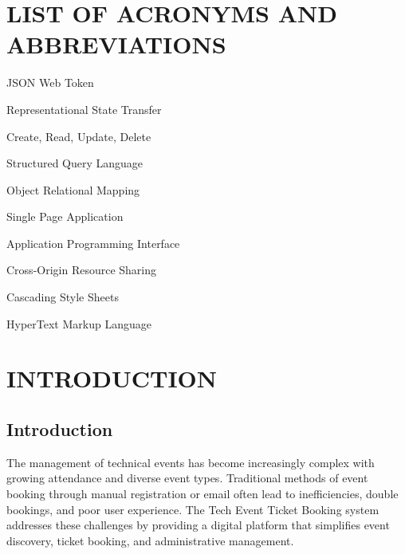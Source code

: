 \documentclass[12pt]{report}
\begin{document}
\listoftables 

 
\newpage 
{} 
  
\chapter*{LIST OF ACRONYMS AND ABBREVIATIONS} 
\begin{abbrv} 
  
\item[JWT] JSON Web Token
\item[REST] Representational State Transfer
\item[CRUD] Create, Read, Update, Delete
\item[SQL] Structured Query Language
\item[ORM] Object Relational Mapping
\item[SPA] Single Page Application
\item[API] Application Programming Interface
\item[CORS] Cross-Origin Resource Sharing
\item[CSS] Cascading Style Sheets
\item[HTML] HyperText Markup Language

\end{abbrv} 

\newpage 
\renewcommand*\contentsname{TABLE OF CONTENTS} 
   
\tableofcontents 
 


\thispagestyle{empty} 
 
\chapter{INTRODUCTION} 
\section{Introduction}
The management of technical events has become increasingly complex with growing attendance and diverse event types. Traditional methods of event booking through manual registration or email often lead to inefficiencies, double bookings, and poor user experience. The Tech Event Ticket Booking system addresses these challenges by providing a digital platform that simplifies event discovery, ticket booking, and administrative management.
\end{document}
